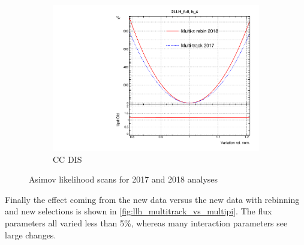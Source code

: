 \begin{figure}[h]
\begin{subfigure}[t]{0.32\textwidth}
		\includegraphics[width=\textwidth,page=26, trim={0mm 0mm 0mm 9mm}, clip]{figures/mach3/2018/llh/MultiPi_vs_MultiTrack_TotalLLH_2017vs2018}
		\caption{CC DIS}
	\end{subfigure}
	\caption{Asimov likelihood scans for 2017 and 2018 analyses}
	\label{fig:llh_2017_vs_2018}
\end{figure}

Finally the effect coming from the new data versus the new data with rebinning and new selections is shown in \autoref{fig:llh_multitrack_vs_multipi}. The flux parameters all varied less than 5\%, whereas many interaction parameters see large changes. 

